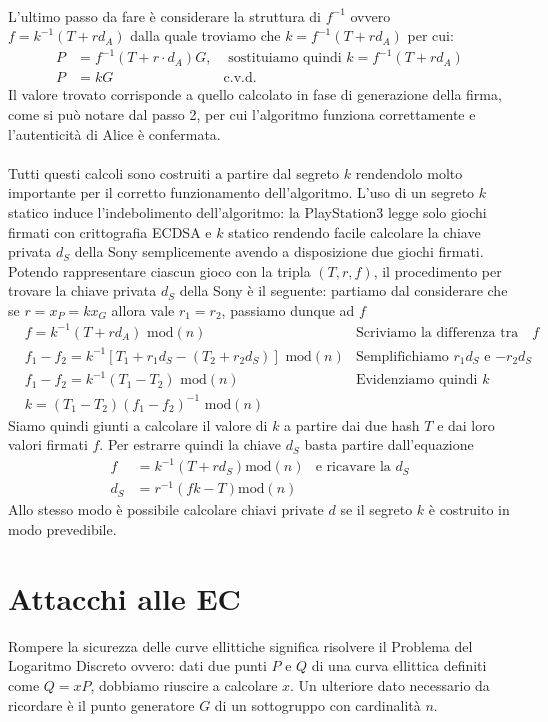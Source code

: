 \documentclass[a4paper,12pt]{tesiinfo}
\begin{document}
\\
L'ultimo passo da fare \`e considerare la struttura di $f^{-1}$ ovvero $f = k^{-1} (T+rd_A)$ dalla quale troviamo che $k = f^{-1} (T+rd_A)$ per cui:
\begin{align*}
 P &= f^{-1}(T + r \cdot d_A)G, &\text{ sostituiamo quindi } k = f^{-1} (T+rd_A)\\
 P &= kG &\text{c.v.d.}
\end{align*}
Il valore trovato corrisponde a quello calcolato in fase di generazione della firma, come si pu\`o notare dal passo 2, per cui l'algoritmo funziona correttamente e l'autenticit\`a di Alice \`e confermata.
\\
\\
Tutti questi calcoli sono costruiti a partire dal segreto $k$ rendendolo molto importante per il corretto funzionamento dell'algoritmo. L'uso di un segreto $k$ statico induce l'indebolimento dell'algoritmo: la PlayStation3 legge solo giochi firmati con crittografia ECDSA e $k$ statico rendendo facile calcolare la chiave privata $d_S$ della Sony semplicemente avendo a disposizione due giochi firmati. Potendo rappresentare ciascun gioco con la tripla $(T, r, f)$, il procedimento per trovare la chiave privata $d_S$ della Sony \`e il seguente: partiamo dal considerare che se $r = x_P = kx_G$ allora vale $r_1 = r_2$, passiamo dunque ad $f$
\begin{align*}
  &f = k^{-1} (T+rd_A) \text{ mod}(n) &\text{Scriviamo la differenza tra le due $f$}\\
  &f_1 - f_2 = k^{-1} [T_1+r_1d_S - (T_2 + r_2d_S)] \text{ mod}(n) &\text{Semplifichiamo $r_1d_S$ e $-r_2d_S$}\\
  &f_1 - f_2 = k^{-1} (T_1 - T_2) \text{ mod$(n)$} &\text{Evidenziamo quindi $k$}\\
  &k= (T_1 - T_2)(f_1 - f_2)^{-1} \text{ mod$(n)$}
\end{align*}
Siamo quindi giunti a calcolare il valore di $k$ a partire dai due hash $T$ e dai loro valori firmati $f$. Per estrarre quindi la chiave $d_S$ basta partire dall'equazione
\begin{align*}
  f &= k^{-1}(T+rd_S) \text{mod}(n) &\text{e ricavare la } d_S\\
  d_S &= r^{-1}(fk-T) \text{mod}(n) 
\end{align*}
Allo stesso modo \`e possibile calcolare chiavi private $d$ se il segreto $k$ \`e costruito in modo prevedibile.
%
%
%
%
%
%
%
%
%
%
%
%
%
%
%
\chapter{Attacchi alle EC}
Rompere la sicurezza delle curve ellittiche significa risolvere il Problema del Logaritmo Discreto ovvero: dati due punti $P$ e $Q$ di una curva ellittica definiti come $Q = xP$, dobbiamo riuscire a calcolare $x$. Un ulteriore dato necessario da ricordare \`e il punto generatore $G$ di un sottogruppo con cardinalit\`a $n$.
\\
\end{document}
